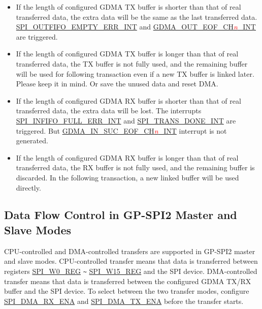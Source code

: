 \documentclass[main\_\_EN.tex]{subfiles}
\begin{document}
\begin{itemize}
    \item If the length of configured GDMA TX buffer is shorter than that of real transferred data, the extra data will be the same as the last transferred data. \hyperref[int:SPIOUTFIFOEMPTYERRINT]{SPI\_OUTFIFO\_EMPTY\_ERR\_INT} and \hyperref[int:GDMAOUTEOFINT]{GDMA\_OUT\_EOF\_CH\textcolor{red}{\it{n}}\_INT} are triggered.

    \item If the length of configured GDMA TX buffer is longer than that of real transferred data, the TX buffer is not fully used, and the remaining buffer will be used for following transaction even if a new TX buffer is linked later. Please keep it in mind. Or save the unused data and reset DMA.

    \item If the length of configured GDMA RX buffer is shorter than that of real transferred data, the extra data will be lost. The interrupts \hyperref[int:SPIINFIFOFULLERRINT]{SPI\_INFIFO\_FULL\_ERR\_INT} and \hyperref[int:SPITRANSDONEINT]{SPI\_TRANS\_DONE\_INT} are triggered. But \hyperref[int:GDMAINSUCEOFINT]{GDMA\_IN\_SUC\_EOF\_CH\textcolor{red}{\it{n}}\_INT} interrupt is not generated.

    \item If the length of configured GDMA RX buffer is longer than that of real transferred data, the RX buffer is not fully used, and the remaining buffer is discarded. In the following transaction, a new linked buffer will be used directly.

\end{itemize}

\subsection{Data Flow Control in GP-SPI2 Master and Slave Modes}\label{Subsection:Data Flow Control in GP-SPI2 Master and Slave Mode}

CPU-controlled and DMA-controlled transfers are supported in GP-SPI2 master and slave modes.
CPU-controlled transfer means that data is transferred between registers \hyperref[regdesc:SPIW0REG]{SPI\_W0\_REG} \verb+~+ \hyperref[regdesc:SPIW15REG]{SPI\_W15\_REG} and the SPI device. DMA-controlled transfer means that data is transferred between the configured GDMA TX/RX buffer and the SPI device. To select between the two transfer modes, configure \hyperref[fielddesc:SPIDMARXENA]{SPI\_DMA\_RX\_ENA} and \hyperref[fielddesc:SPIDMATXENA]{SPI\_DMA\_TX\_ENA} before the transfer starts.
\end{document}
